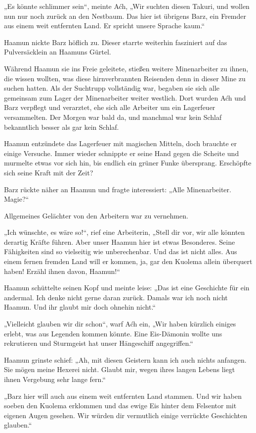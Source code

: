 „Es könnte schlimmer sein“, meinte Aćh, „Wir suchten diesen Takuri, und wollen nun nur noch zurück an den Nestbaum. Das hier ist übrigens Barz, ein Fremder aus einem weit entfernten Land. Er spricht unsere Sprache kaum.“

Haamun nickte Barz höflich zu. Dieser starrte weiterhin fasziniert auf das Pulversäcklein an Haamuns Gürtel.

Während Haamun sie ins Freie geleitete, stießen weitere Minenarbeiter zu ihnen, die wissen wollten, was diese hirnverbrannten Reisenden denn in dieser Mine zu suchen hatten. Als der Suchtrupp vollständig war, begaben sie sich alle gemeinsam zum Lager der Minenarbeiter weiter westlich. Dort wurden Aćh und Barz verpflegt und verarztet, ehe sich alle Arbeiter um ein Lagerfeuer versammelten. Der Morgen war bald da, und manchmal war kein Schlaf bekanntlich besser als gar kein Schlaf.

Haamun entzündete das Lagerfeuer mit magischen Mitteln, doch brauchte er einige Versuche. Immer wieder schnippte er seine Hand gegen die Scheite und murmelte etwas vor sich hin, bis endlich ein grüner Funke übersprang. Erschöpfte sich seine Kraft mit der Zeit?

Barz rückte näher an Haamun und fragte interessiert: „Alle Minenarbeiter. Magie?“

Allgemeines Gelächter von den Arbeitern war zu vernehmen.

„Ich wünschte, es wäre so!“, rief eine Arbeiterin, „Stell dir vor, wir alle könnten derartig Kräfte führen. Aber unser Haamun hier ist etwas Besonderes. Seine Fähigkeiten sind so vielseitig wie unberechenbar. Und das ist nicht alles. Aus einem fernen fremden Land will er kommen, ja, gar den Kuolema allein überquert haben! Erzähl ihnen davon, Haamun!“

Haamun schüttelte seinen Kopf und meinte leise: „Das ist eine Geschichte für ein andermal. Ich denke nicht gerne daran zurück. Damals war ich noch nicht Haamun. Und ihr glaubt mir doch ohnehin nicht.“

„Vielleicht glauben wir dir schon“, warf Aćh ein, „Wir haben kürzlich einiges erlebt, was aus Legenden kommen könnte. Eine Eis-Dämonin wollte uns rekrutieren und Sturmgeist hat unser Hängeschiff angegriffen.“

Haamun grinste schief: „Ah, mit diesen Geistern kann ich auch nichts anfangen. Sie mögen meine Hexerei nicht. Glaubt mir, wegen ihres langen Lebens liegt ihnen Vergebung sehr lange fern.“

„Barz hier will auch aus einem weit entfernten Land stammen. Und wir haben soeben den Kuolema erklommen und das ewige Eis hinter dem Felsentor mit eigenen Augen gesehen. Wir würden dir vermutlich einige verrückte Geschichten glauben.“

